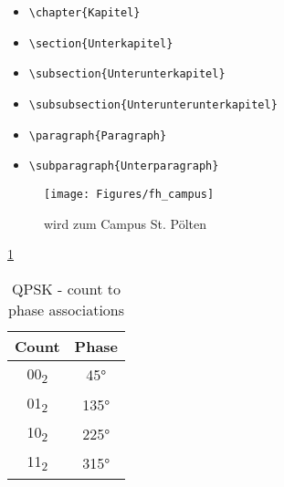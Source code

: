 \begin{itemize}
	\item \verb|\chapter{Kapitel}|
	\item \verb|\section{Unterkapitel}|
	\item \verb|\subsection{Unterunterkapitel}|
	\item \verb|\subsubsection{Unterunterunterkapitel}|
	\item \verb|\paragraph{Paragraph}|
	\item \verb|\subparagraph{Unterparagraph}|
\end{itemize}


\begin{figure}[H]
	\centering
	\texttt{[image: Figures/fh\_campus]}
	\caption{wird zum Campus St. Pölten~\cite{fhcampus_link}}
	\label{fig:fhcampus}
\end{figure}

\ref{fig:fhcampus}



\begin{table}[H]
    \centering
\begin{tabular}{||c c||} 
 \hline
 Count &  Phase \\ [0.5ex] 
 \hline\hline
 00\textsubscript{2} & 45° \\ 
 \hline
 01\textsubscript{2} & 135° \\
 \hline
 10\textsubscript{2} & 225° \\
 \hline
 11\textsubscript{2} & 315° \\
 \hline
\end{tabular}
    \caption{QPSK - count to phase associations}
    \label{tab:QPSK - count to phase associations}
\end{table}



